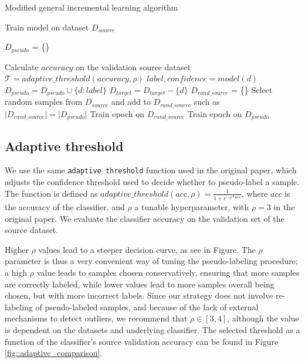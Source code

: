 \documentclass[12pt, a4paper]{article}
\newcommand{\threshold}{\mathcal{T}}
\begin{document}
	\begin{algorithm}
		\caption{Modified general incremental learning algorithm} 
		\label{al::modified-ican}
		\begin{algorithmic}[1]	
			\State Train model on dataset $D_{source}$
			
			\State $D_{pseudo}$ = \{\}
			
					\State Calculate $accuracy$ on the validation source dataset
					\State $\threshold = adaptive\_threshold(accuracy, \rho)$
						\State $label, confidence = model(d)$
						\If{$confidence > \threshold$}
							\State $D_{pseudo} = D_{pseudo} \cup \{d: label\}$
							\State $D_{target} = D_{target} - \{d\}$
						\EndIf
					\EndFor
				\EndIf
				\State $D_{rand\_source}$ = \{\}
				\State Select random samples from $D_{source}$ and add to $D_{rand\_source}$ such as $\lvert D_{rand\_source} \rvert = \lvert D_{pseudo} \rvert$
				\State Train epoch on $D_{rand\_source}$
				\State Train epoch on $D_{pseudo}$
			\EndFor
			
		\end{algorithmic} 
	\end{algorithm}


	\subsection{Adaptive threshold}
	\label{ssec:threshold}
	
	We use the same \texttt{adaptive threshold} function used in the original paper, which adjusts the confidence threshold used to decide whether to pseudo-label a sample. The function is defined as $adaptive\_threshold(acc, \rho) = \frac{1}{1+e^{-\rho*acc}}$, where $acc$ is the accuracy of the classifier, and $\rho$ a tunable hyperparameter, with $\rho=3$ in the original paper. We evaluate the classifier accuracy on the validation set of the source dataset.
	
	Higher $\rho$ values lead to a steeper decision curve, as see in Figure. The $\rho$ parameter is thus a very convenient way of tuning the pseudo-labeling procedure; a high $\rho$ value leads to samples chosen conservatively, ensuring that more samples are correctly labeled, while lower values lead to more samples overall being chosen, but with more incorrect labels. Since our strategy does not involve re-labeling of pseudo-labeled samples, and because of the lack of external mechanisms to detect outliers, we recommend that $\rho \in [3,4]$, although the value is dependent on the datasets and underlying classifier. The selected threshold as a function of the classifier's source validation accuracy can be found in Figure \ref{fig::adaptive_comparison}.
	
\end{document}
